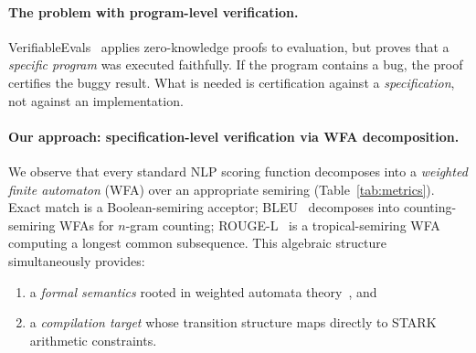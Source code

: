 \documentclass[11pt]{article}
\begin{document}
\paragraph{The problem with program-level verification.}
VerifiableEvals~\cite{south2024verifiableevals} applies zero-knowledge
proofs to evaluation, but proves that a \emph{specific program} was
executed faithfully.  If the program contains a bug, the proof
certifies the buggy result.  What is needed is certification against
a \emph{specification}, not against an implementation.

\paragraph{Our approach: specification-level verification via WFA decomposition.}
We observe that every standard NLP scoring function decomposes into a
\emph{weighted finite automaton} (WFA) over an appropriate semiring
(Table~\ref{tab:metrics}).  Exact match is a Boolean-semiring acceptor;
BLEU~\cite{papineni2002bleu} decomposes into counting-semiring WFAs
for $n$-gram counting; ROUGE-L~\cite{lin2004rouge} is a
tropical-semiring WFA computing a longest common subsequence.
This algebraic structure simultaneously provides:
\begin{enumerate}[nosep,leftmargin=*]
\item a \emph{formal semantics} rooted in weighted automata
  theory~\cite{schutzenberger1961,droste2009handbook}, and
\item a \emph{compilation target} whose transition structure maps
  directly to STARK arithmetic constraints.
\end{enumerate}
\end{document}
